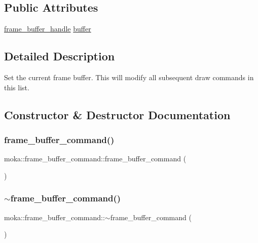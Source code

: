 \subsection*{Public Attributes}
\begin{DoxyCompactItemize}
\item 
\mbox{\hyperlink{structmoka_1_1frame__buffer__handle}{frame\+\_\+buffer\+\_\+handle}} \mbox{\hyperlink{classmoka_1_1frame__buffer__command_a914e3a4d2d80c5005f71706bb800bec6}{buffer}}
\end{DoxyCompactItemize}


\subsection{Detailed Description}
Set the current frame buffer. This will modify all subsequent draw commands in this list. 

\subsection{Constructor \& Destructor Documentation}
\mbox{\label{classmoka_1_1frame__buffer__command_ad3094b980fd94b8fd11b26bafb1c9814}} 
\subsubsection{\texorpdfstring{frame\_buffer\_command()}{frame\_buffer\_command()}\hspace{0.1cm}{\footnotesize\ttfamily [1/3]}}
{\footnotesize\ttfamily moka\+::frame\+\_\+buffer\+\_\+command\+::frame\+\_\+buffer\+\_\+command (\begin{DoxyParamCaption}{ }\end{DoxyParamCaption})}

\mbox{\label{classmoka_1_1frame__buffer__command_a035a2963183c0b6dcf52b1c914fbdf6e}} 
\subsubsection{\texorpdfstring{$\sim$frame\_buffer\_command()}{~frame\_buffer\_command()}}
{\footnotesize\ttfamily moka\+::frame\+\_\+buffer\+\_\+command\+::$\sim$frame\+\_\+buffer\+\_\+command (\begin{DoxyParamCaption}{ }\end{DoxyParamCaption})}

